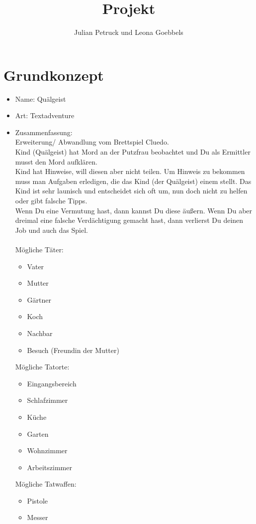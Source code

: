\documentclass[10pt,a4paper]{article}
\title{Projekt}
\author{Julian Petruck und Leona Goebbels}
\begin{document}
\maketitle
\newcommand{\thetitle} {Projekt}

\section*{Grundkonzept}
\begin{itemize}
\item Name: Quälgeist
\item Art: Textadventure
\item Zusammenfassung:\\
Erweiterung/ Abwandlung vom Brettspiel Cluedo.\\
Kind (Quälgeist) hat Mord an der Putzfrau beobachtet und Du als Ermittler musst den Mord aufklären.\\
Kind hat Hinweise, will diesen aber nicht teilen. Um Hinweis zu bekommen muss man Aufgaben erledigen, die das Kind (der Quälgeist) einem stellt. Das Kind ist sehr launisch und entscheidet sich oft um, nun doch nicht zu helfen oder gibt falsche Tipps.\\
Wenn Du eine Vermutung hast, dann kannst Du diese äußern. 
Wenn Du aber dreimal eine falsche Verdächtigung gemacht hast, dann verlierst Du deinen Job und auch das Spiel.\\
\ \\
Mögliche Täter:
\begin{itemize}
\item Vater
\item Mutter
\item Gärtner
\item Koch
\item Nachbar
\item Besuch (Freundin der Mutter)
\end{itemize}
Mögliche Tatorte:
\begin{itemize}
\item Eingangsbereich
\item Schlafzimmer
\item Küche
\item Garten
\item Wohnzimmer
\item Arbeitszimmer
\end{itemize}
Mögliche Tatwaffen:
\begin{itemize}
\item Pistole
\item Messer

\end{itemize}
\end{itemize}
\end{document}
